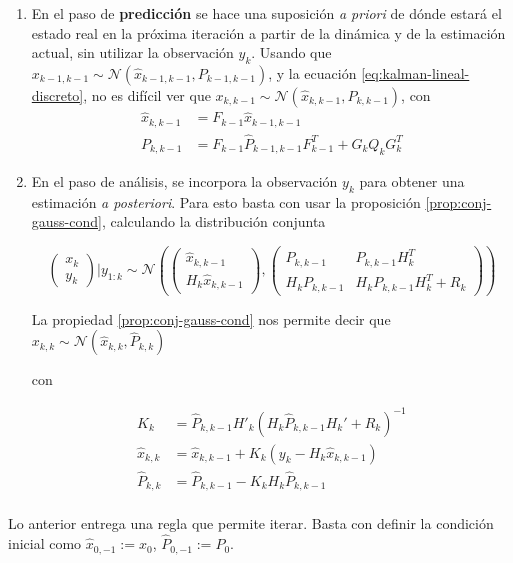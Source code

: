 \begin{enumerate}
\def\labelenumi{\arabic{enumi}.}
\item
  En el paso de \textbf{predicción} se hace una suposición \emph{a priori} de dónde estará el estado real en la próxima iteración a partir de la dinámica y de la estimación actual, sin utilizar la observación \(y_k\). Usando que \(x_{k-1,k-1} \sim \mathcal{N}(\hat{x}_{k-1,k-1}, P_{k-1,k-1})\), y la ecuación \ref{eq:kalman-lineal-discreto}, no es difícil ver que \(x_{k,k-1} \sim \mathcal{N}(\hat{x}_{k,k-1}, P_{k,k-1})\), con 
    \begin{equation}
    \begin{aligned}
    \hat{x}_{k,k-1} &= F_{k-1} \hat{x}_{k-1,k-1} \\
    P_{k,k-1} &= F_{k-1} \hat{P}_{k-1,k-1} F_{k-1}^{T} + G_k Q_k G_k^T
    \end{aligned}
    \end{equation}
\item
  En el paso de análisis, se incorpora la observación \(y_k\) para obtener una estimación \emph{a posteriori}. Para esto basta con usar la proposición \ref{prop:conj-gauss-cond}, calculando la distribución conjunta 
  
    \begin{equation}
    \begin{pmatrix}
    x_k \\
    y_k
    \end{pmatrix} \Big| y_{1:k} \sim \mathcal{N}\left(
    \begin{pmatrix}
    \hat{x}_{k, k-1} \\
    H_k \hat{x}_{k,k-1}
    \end{pmatrix},
    \begin{pmatrix}
    P_{k,k-1} & P_{k,k-1} H^T_{k}\\
    H_{k}P_{k,k-1}  & H_{k}P_{k,k-1}H_{k}^T + R_k
    \end{pmatrix}  
    \right)
    \end{equation}

    La propiedad \ref{prop:conj-gauss-cond} nos permite decir que \(
    x_{k,k} \sim
     \mathcal{N} \left( \hat{x}_{k,k}, \hat{P}_{k,k} \right)
    \)

    con 

    \begin{equation}
    \begin{aligned}
    K_k &= \hat{P}_{k,k-1} H'_{k}(H_{k}\hat{P}_{k,k-1}H_{k}' + R_k)^{-1}\\
    \hat{x}_{k,k} &= \hat{x}_{k, k-1} + K_k(y_k-H_k \hat{x}_{k,k-1}) \\
    \hat{P}_{k,k} &= \hat{P}_{k,k-1}- K_k H_{k}\hat{P}_{k,k-1} \\
    \end{aligned}
    \end{equation}
\end{enumerate}
Lo anterior entrega una regla que permite iterar. Basta con definir la condición inicial como \(\hat{x}_{0,-1} := x_0\), \(\hat{P}_{0,-1} := P_0\).

